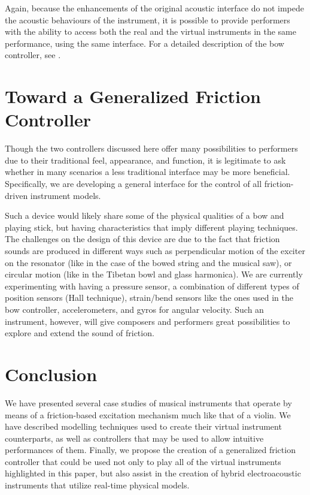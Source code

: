 Again, because the enhancements of the original acoustic interface do not impede the acoustic behaviours of the instrument, it is possible to provide performers with the ability to access both the real and the virtual instruments in the same performance, using the same interface. For a detailed description of the bow controller, see \cite{Young:2002a}.


\section{Toward a Generalized Friction Controller}

Though the two controllers discussed here offer many possibilities to performers due to their traditional feel, appearance, and function, it is legitimate to ask whether in many scenarios a less traditional interface may be more beneficial. Specifically, we are developing a general interface for the control of all friction-driven instrument models.

Such a device would likely share some of the physical qualities of a bow and playing stick, but having characteristics that imply different playing techniques. The challenges on the design of this device are due to the fact that friction sounds are produced in different ways such as perpendicular motion of the exciter on the resonator (like in the case of the bowed string and the musical saw), or circular motion (like in the Tibetan bowl and glass harmonica). We are currently experimenting with having a pressure sensor, a combination of different types of position sensors (Hall technique), strain/bend sensors like the ones used in the bow controller, accelerometers, and gyros for angular velocity. Such an instrument, however, will give composers and performers great possibilities to explore and extend the sound of friction.


\section{Conclusion}

We have presented several case studies of musical instruments that operate by means of a friction-based excitation mechanism much like that of a violin. We have described modelling techniques used to create their virtual instrument counterparts, as well as controllers that may be used to allow intuitive performances of them. Finally, we propose the creation of a generalized friction controller that could be used not only to play all of the virtual instruments highlighted in this paper, but also assist in the creation of hybrid electroacoustic instruments that utilize real-time physical models.

